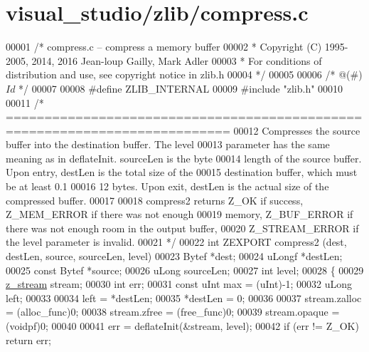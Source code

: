 \hypertarget{visual__studio_2zlib_2compress_8c_source}{}\section{visual\+\_\+studio/zlib/compress.c}
\label{visual__studio_2zlib_2compress_8c_source}

\begin{DoxyCode}
00001 \textcolor{comment}{/* compress.c -- compress a memory buffer}
00002 \textcolor{comment}{ * Copyright (C) 1995-2005, 2014, 2016 Jean-loup Gailly, Mark Adler}
00003 \textcolor{comment}{ * For conditions of distribution and use, see copyright notice in zlib.h}
00004 \textcolor{comment}{ */}
00005 
00006 \textcolor{comment}{/* @(#) $Id$ */}
00007 
00008 \textcolor{preprocessor}{#define ZLIB\_INTERNAL}
00009 \textcolor{preprocessor}{#include "zlib.h"}
00010 
00011 \textcolor{comment}{/* ===========================================================================}
00012 \textcolor{comment}{     Compresses the source buffer into the destination buffer. The level}
00013 \textcolor{comment}{   parameter has the same meaning as in deflateInit.  sourceLen is the byte}
00014 \textcolor{comment}{   length of the source buffer. Upon entry, destLen is the total size of the}
00015 \textcolor{comment}{   destination buffer, which must be at least 0.1%
00016 \textcolor{comment}{   12 bytes. Upon exit, destLen is the actual size of the compressed buffer.}
00017 \textcolor{comment}{}
00018 \textcolor{comment}{     compress2 returns Z\_OK if success, Z\_MEM\_ERROR if there was not enough}
00019 \textcolor{comment}{   memory, Z\_BUF\_ERROR if there was not enough room in the output buffer,}
00020 \textcolor{comment}{   Z\_STREAM\_ERROR if the level parameter is invalid.}
00021 \textcolor{comment}{*/}
00022 \textcolor{keywordtype}{int} ZEXPORT compress2 (dest, destLen, source, sourceLen, level)
00023     Bytef *dest;
00024     uLongf *destLen;
00025     \textcolor{keyword}{const} Bytef *source;
00026     uLong sourceLen;
00027     \textcolor{keywordtype}{int} level;
00028 \{
00029     \hyperlink{structz__stream__s}{z\_stream} stream;
00030     \textcolor{keywordtype}{int} err;
00031     \textcolor{keyword}{const} uInt max = (uInt)-1;
00032     uLong left;
00033 
00034     left = *destLen;
00035     *destLen = 0;
00036 
00037     stream.zalloc = (alloc\_func)0;
00038     stream.zfree = (free\_func)0;
00039     stream.opaque = (voidpf)0;
00040 
00041     err = deflateInit(&stream, level);
00042     \textcolor{keywordflow}{if} (err != Z\_OK) \textcolor{keywordflow}{return} err;
}
\end{DoxyCode}
